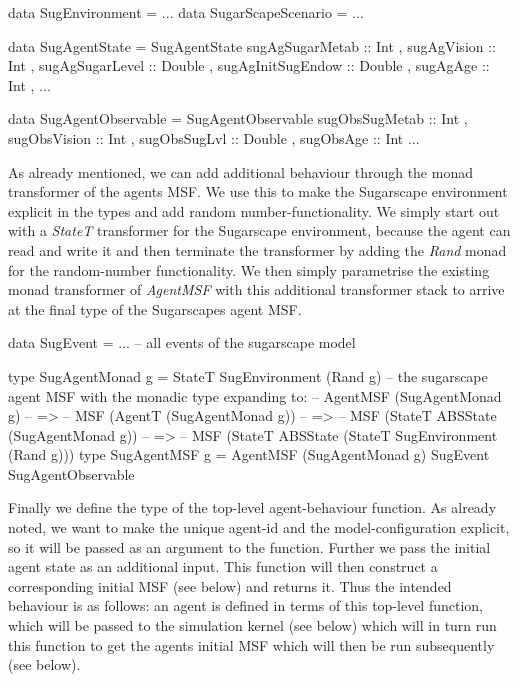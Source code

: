 \begin{HaskellCode}
data SugEnvironment     = ...
data SugarScapeScenario = ...

data SugAgentState = SugAgentState
  { sugAgSugarMetab   :: Int
  , sugAgVision       :: Int
  , sugAgSugarLevel   :: Double
  , sugAgInitSugEndow :: Double
  , sugAgAge          :: Int
  , ...
  }
  
data SugAgentObservable = SugAgentObservable
  { sugObsSugMetab :: Int
  , sugObsVision   :: Int
  , sugObsSugLvl   :: Double
  , sugObsAge      :: Int
  ...  
  }
\end{HaskellCode}

As already mentioned, we can add additional behaviour through the monad transformer of the agents MSF. We use this to make the Sugarscape environment explicit in the types and add random number-functionality. We simply start out with a \textit{StateT} transformer for the Sugarscape environment, because the agent can read and write it and then terminate the transformer by adding the \textit{Rand} monad for the random-number functionality. We then simply parametrise the existing monad transformer of \textit{AgentMSF} with this additional transformer stack to arrive at the final type of the Sugarscapes agent MSF.

\begin{HaskellCode}
data SugEvent = ... -- all events of the sugarscape model

type SugAgentMonad g = StateT SugEnvironment (Rand g)
-- the sugarscape agent MSF with the monadic type expanding to:
-- AgentMSF (SugAgentMonad g)
-- => 
-- MSF (AgentT (SugAgentMonad g))
-- => 
-- MSF (StateT ABSState (SugAgentMonad g))
-- =>
-- MSF (StateT ABSState (StateT SugEnvironment (Rand g)))
type SugAgentMSF g = AgentMSF (SugAgentMonad g) SugEvent SugAgentObservable
\end{HaskellCode}

Finally we define the type of the top-level agent-behaviour function. As already noted, we want to make the unique agent-id and the model-configuration explicit, so it will be passed as an argument to the function. Further we pass the initial agent state as an additional input. This function will then construct a corresponding initial MSF (see below) and returns it. Thus the intended behaviour is as follows: an agent is defined in terms of this top-level function, which will be passed to the simulation kernel (see below) which will in turn run this function to get the agents initial MSF which will then be run subsequently (see below).

